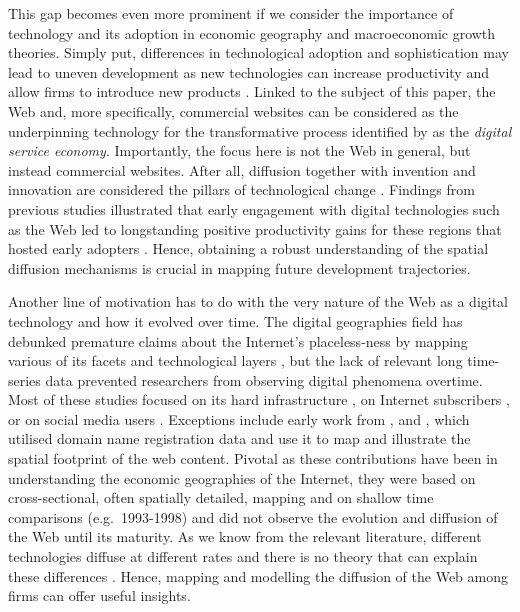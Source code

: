 \documentclass[
  authoryear,
  preprint,
  3p]{elsarticle}
\begin{document}
This gap becomes even more prominent if we consider the importance of
technology and its adoption in economic geography and macroeconomic
growth theories. Simply put, differences in technological adoption and
sophistication may lead to uneven development as new technologies can
increase productivity and allow firms to introduce new products
\citep{solow1957technical, aghion1990model, kemeny2011international}.
Linked to the subject of this paper, the Web and, more specifically,
commercial websites can be considered as the underpinning technology for
the transformative process identified by \citet{capello2024nexus} as the
\emph{digital service economy}. Importantly, the focus here is not the
Web in general, but instead commercial websites. After all, diffusion
together with invention and innovation are considered the pillars of
technological change \citep{das2022diffusion}. Findings from previous
studies illustrated that early engagement with digital technologies such
as the Web led to longstanding positive productivity gains for these
regions that hosted early adopters \citep{tranosuk}. Hence, obtaining a
robust understanding of the spatial diffusion mechanisms is crucial in
mapping future development trajectories.

Another line of motivation has to do with the very nature of the Web as
a digital technology and how it evolved over time. The digital
geographies field has debunked premature claims about the Internet's
placeless-ness by mapping various of its facets and technological layers
\citep{tranos2013death}, but the lack of relevant long time-series data
prevented researchers from observing digital phenomena overtime. Most of
these studies focused on its hard infrastructure
\citep[e.g.][]{malecki2002economic, moss2000internet}, on Internet
subscribers \citep[e.g.][]{blank2018local}, or on social media users
\citep[e.g.][]{crampton2013beyond}. Exceptions include early work from
\citet{zook2000web}, \citet{zook2000web} and \citet{moss1997tracking},
which utilised domain name registration data and use it to map and
illustrate the spatial footprint of the web content. Pivotal as these
contributions have been in understanding the economic geographies of the
Internet, they were based on cross-sectional, often spatially detailed,
mapping and on shallow time comparisons (e.g.~1993-1998) and did not
observe the evolution and diffusion of the Web until its maturity. As we
know from the relevant literature, different technologies diffuse at
different rates and there is no theory that can explain these
differences \citep{leibowicz2016representing}. Hence, mapping and
modelling the diffusion of the Web among firms can offer useful
insights.
\end{document}

